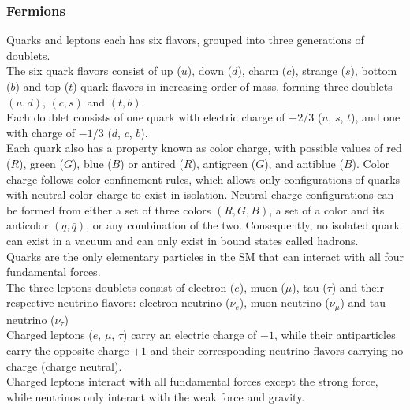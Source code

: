 \documentclass[../thesis.tex]{subfiles}
\begin{document}
\subsubsection*{Fermions}
Quarks and leptons each has six flavors, grouped into three generations of doublets.\\
The six quark flavors consist of up ($u$), down ($d$), charm ($c$), strange ($s$), bottom ($b$) and top ($t$) quark flavors in increasing order of mass, forming three doublets $(u,d)$, $(c,s)$ and $(t,b)$.\\
Each doublet consists of one quark with electric charge of $+2/3$ ($u$, $s$, $t$), and one with charge of $-1/3$ ($d$, $c$, $b$).\\
Each quark also has a property known as color charge, with possible values of red ($R$), green ($G$), blue ($B$) or antired ($\bar{R}$), antigreen ($\bar{G}$), and antiblue ($\bar{B}$). Color charge follows color confinement rules, which allows only configurations of quarks with neutral color charge to exist in isolation. Neutral charge configurations can be formed from either a set of three colors $(R,G,B)$, a set of a color and its anticolor $(q,\bar{q})$, or any combination of the two. Consequently, no isolated quark can exist in a vacuum and can only exist in bound states called hadrons.\\
Quarks are the only elementary particles in the SM that can interact with all four fundamental forces.\\
The three leptons doublets consist of electron ($e$), muon ($\mu$), tau ($\tau$) and their respective neutrino flavors: electron neutrino ($\nu_e$), muon neutrino ($\nu_\mu$) and tau neutrino ($\nu_\tau$)\\
Charged leptons ($e$, $\mu$, $\tau$) carry an electric charge of $-1$, while their antiparticles carry the opposite charge $+1$ and their corresponding neutrino flavors carrying no charge (charge neutral).\\
Charged leptons interact with all fundamental forces except the strong force, while neutrinos only interact with the weak force and gravity.
\end{document}
